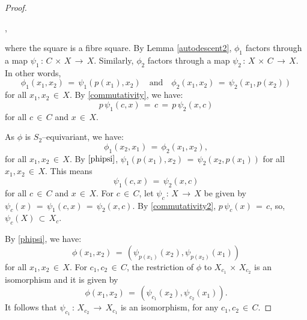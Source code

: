 \documentclass[12pt,reqno]{amsart}
\theoremstyle{definition}
\numberwithin{equation}{section}
\begin{document}
\begin{proof}
\begin{center}
,
\end{center}
where the square is a fibre square. By Lemma \ref{autodescent2}, $\phi_{1}$ factors through a map $\psi_{1}\,:\, C\,\times\, X\,\longrightarrow\, X$. Similarly, $\phi_{2}$ factors through a map $\psi_{2}\,:\, X\,\times\, C\,\longrightarrow\, X$. In other words, 
\begin{equation}\label{phipsi}
\phi_{1}(x_{1}, x_{2})\,=\, \psi_{1}(p(x_{1}),x_{2}) \quad\textrm{and}\quad  \phi_{2}(x_{1},x_{2})\,=\, \psi_{2}(x_{1}, p(x_{2}))
\end{equation}
for all $x_{1}, x_{2}\,\in\, X$. By \eqref{commutativity}, we have:
\begin{equation}\label{commutativity2}
p\, \psi_{1}(c,x)\,=\, c\,=\, p\, \psi_{2} (x,c)    
\end{equation}
for all $c\,\in \,C$ and $x\,\in\, X$.

As $\phi$ is $S_2$--equivariant, we have:
\begin{equation*}
\phi_{1}(x_{2},x_{1})\,=\, \phi_{2}(x_{1}, x_{2}),   
\end{equation*}
for all $x_{1}, x_{2}\,\in\, X$. By $\eqref{phipsi}$, $\psi_{1}(p(x_{1}),x_{2})\,=\, \psi_{2}(x_{2},p(x_{1}))$ for all $x_{1}, x_{2}\,\in\, X$. This means 
\begin{equation*}
\psi_{1}(c,x)\,=\, \psi_{2}(x,c)    
\end{equation*}
for all $c\,\in\, C$ and $x\,\in\, X$. For $c\,\in\,C$, let $\psi_{c}\,:\, X\,\longrightarrow\, X$
be given by $\psi_{c}(x)\,=\,\psi_{1}(c, x)\,=\, \psi_{2}(x,c)$. By \eqref{commutativity2}, $p\,\psi_{c}(x)\,=\,c$, so, $\psi_{c}(X)\,\subset\, X_{c}$. 

By \eqref{phipsi}, we have:
\begin{equation*}
\phi(x_{1},x_{2})\,=\, (\psi_{p(x_{1})}(x_{2}), \psi_{p(x_{2})}(x_{1}))    
\end{equation*}
for all $x_{1}, x_{2}\,\in\, X$. For $c_{1},c_{2}\,\in\,C$, the restriction of $\phi$ to $X_{c_{1}}\,\times\, X_{c_{2}}$ is an isomorphism and it is given by 
\begin{equation*}
\phi(x_{1},x_{2})\,=\, (\psi_{c_{1}}(x_{2}), \psi_{c_{2}}(x_{1})).    
\end{equation*}
It follows that $\psi_{c_{1}}\,:\, X_{c_{2}}\,\longrightarrow\,X_{c_{1}}$ is an isomorphism, for any $c_{1}, c_{2}\,\in\, C$.


\end{proof}
\end{document}
